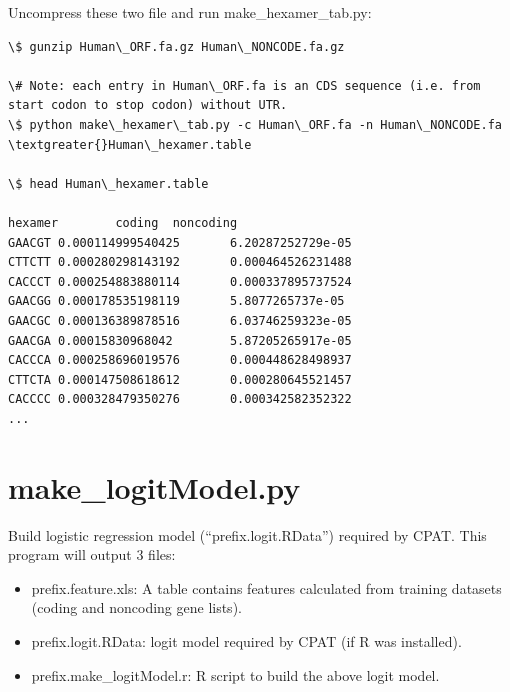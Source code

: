 \documentclass[letterpaper,10pt,english]{sphinxmanual}
\begin{document}
Uncompress these two file and run make\_hexamer\_tab.py:

\begin{Verbatim}[commandchars=\\\{\}]
\$ gunzip Human\_ORF.fa.gz Human\_NONCODE.fa.gz

\# Note: each entry in Human\_ORF.fa is an CDS sequence (i.e. from start codon to stop codon) without UTR.
\$ python make\_hexamer\_tab.py -c Human\_ORF.fa -n Human\_NONCODE.fa  \textgreater{}Human\_hexamer.table

\$ head Human\_hexamer.table

hexamer        coding  noncoding
GAACGT 0.000114999540425       6.20287252729e-05
CTTCTT 0.000280298143192       0.000464526231488
CACCCT 0.000254883880114       0.000337895737524
GAACGG 0.000178535198119       5.8077265737e-05
GAACGC 0.000136389878516       6.03746259323e-05
GAACGA 0.00015830968042        5.87205265917e-05
CACCCA 0.000258696019576       0.000448628498937
CTTCTA 0.000147508618612       0.000280645521457
CACCCC 0.000328479350276       0.000342582352322
...
\end{Verbatim}


\section{make\_logitModel.py}
\label{index:make-logitmodel-py}
Build logistic regression model (``prefix.logit.RData'') required by CPAT. This program will output
3 files:
\begin{itemize}
\item {} 
prefix.feature.xls: A table contains features calculated from training datasets (coding and noncoding gene lists).

\item {} 
prefix.logit.RData: logit model required by CPAT (if R was installed).

\item {} 
prefix.make\_logitModel.r: R script to build the above logit model.

\end{itemize}
\end{document}
